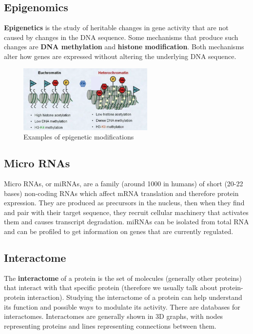     \subsection{Epigenomics}
      \textbf{Epigenetics} is the study of heritable changes in gene activity that are not caused by changes in the DNA sequence. Some mechanisms that produce such changes are \textbf{DNA methylation} and \textbf{histone modification}. Both mechanisms alter how genes are expressed without altering the underlying DNA sequence.

      \begin{figure}[h]
      \caption{Examples of epigenetic modifications}
      \centering
      \includegraphics[width=0.6\textwidth]{EuEteroChromatin}
      \end{figure}

    \subsection{Micro RNAs}
      Micro RNAs, or miRNAs, are a family (around 1000 in humans) of short (20-22 bases) non-coding RNAs which affect mRNA translation and therefore protein expression. They are produced as precursors in the nucleus, then when they find and pair with their target sequence, they recruit cellular machinery that activates them and causes transcript degradation. miRNAs can be isolated from total RNA and can be profiled to get information on genes that are currently regulated.

    \subsection{Interactome}
      The \textbf{interactome} of a protein is the set of molecules (generally other proteins) that interact with that specific protein (therefore we usually talk about protein-protein interaction). Studying the interactome of a protein can help understand its function and possible ways to modulate its activity. There are databases for interactomes. Interactomes are generally shown in 3D graphs, with nodes representing proteins and lines representing connections between them.  

